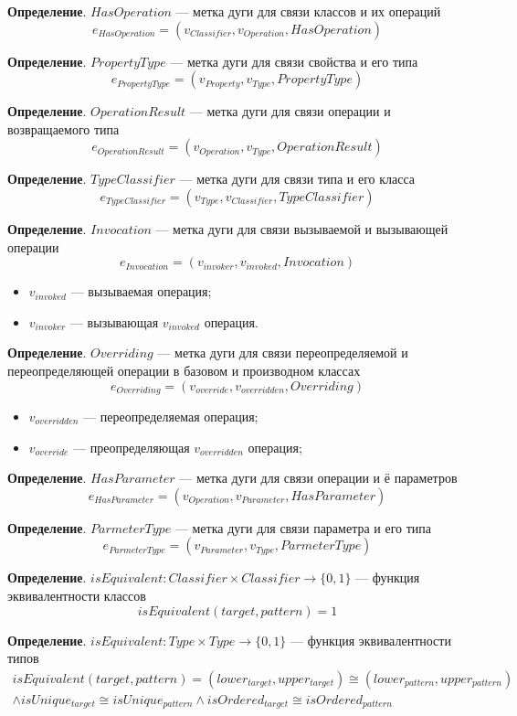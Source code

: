 \textbf{Определение}. $HasOperation$ --- метка дуги для связи классов и их операций
%
$$e_{HasOperation} = (v_{Classifier}, v_{Operation}, HasOperation)$$

\textbf{Определение}. $PropertyType$ --- метка дуги для связи свойства и его типа
%
$$e_{PropertyType} = (v_{Property}, v_{Type}, PropertyType)$$

\textbf{Определение}. $OperationResult$ --- метка дуги для связи операции и возвращаемого типа
%
$$e_{OperationResult} = (v_{Operation}, v_{Type}, OperationResult)$$

\textbf{Определение}. $TypeClassifier$ --- метка дуги для связи типа и его класса
%
$$e_{TypeClassifier} = (v_{Type}, v_{Classifier}, TypeClassifier)$$

\textbf{Определение}. $Invocation$ --- метка дуги для связи вызываемой и вызывающей операции
%
$$e_{Invocation} = (v_{invoker}, v_{invoked}, Invocation)$$
%
\begin{itemize}
\item $v_{invoked}$ --- вызываемая операция;
\item $v_{invoker}$ --- вызывающая $v_{invoked}$ операция.
\end{itemize}

\textbf{Определение}. $Overriding$ --- метка дуги для связи
переопределяемой и переопределяющей операции в базовом и производном классах
%
$$e_{Overriding} = (v_{override}, v_{overridden}, Overriding)$$

\begin{itemize}
\item $v_{overridden}$ --- переопределяемая операция;
\item $v_{override}$ --- преопределяющая $v_{overridden}$ операция;
\end{itemize}

\textbf{Определение}. $HasParameter$ --- метка дуги для связи операции и ё параметров
%
$$e_{HasParameter} = (v_{Operation}, v_{Parameter}, HasParameter)$$

\textbf{Определение}. $ParmeterType$ --- метка дуги для связи параметра и его типа
%
$$e_{ParmeterType} = (v_{Parameter}, v_{Type}, ParmeterType)$$

\textbf{Определение}. $isEquivalent: Classifier \times Classifier \to \{ 0, 1 \}$
--- функция эквивалентности классов
%
$$isEquivalent(target, pattern) = 1$$

\textbf{Определение}. $isEquivalent: Type \times Type \to \{ 0, 1 \}$
--- функция эквивалентности типов
%
\begin{multline*}
isEquivalent(target, pattern) = (lower_{target}, upper_{target}) \cong (lower_{pattern}, upper_{pattern}) \\
\land isUnique_{target} \cong isUnique_{pattern} \land isOrdered_{target} \cong isOrdered_{pattern}
\end{multline*}

